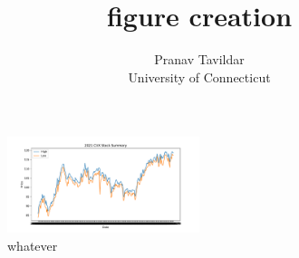 \documentclass[12pt, letterpaper, titlepage]{article}
\title{figure creation}
\author{Pranav Tavildar\\
  University of Connecticut
}
\begin{document}
\maketitle
\begin{figure}[!htb]
  \centering
  \includegraphics[width=0.5\textwidth]{../figures/fig1.pdf}
  \caption{whatever}\label{fig:whatever}
\end{figure}
\end{document}

